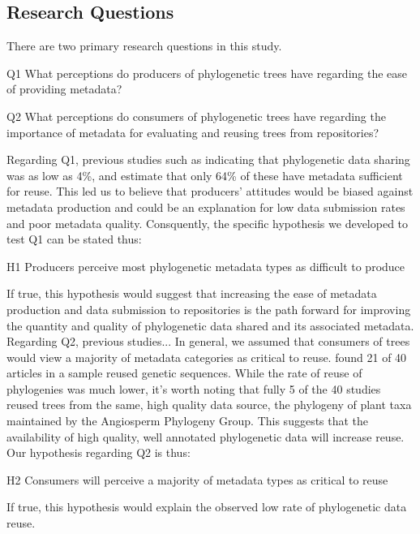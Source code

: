 \documentclass[12pt]{scrartcl}
\begin{document}
\subsection{Research Questions}
There are two primary research questions in this study.  
\begin{compactitem}
	\item[Q1] What perceptions do producers of phylogenetic trees have regarding the ease of providing metadata?
	\item[Q2] What perceptions do consumers of phylogenetic trees have regarding the importance of metadata for evaluating and reusing trees from repositories?
\end{compactitem}
Regarding Q1, previous studies such as \citet{Stoltzfus2012} indicating that phylogenetic data sharing was as low as 4\%, and \citet{Drew2013} estimate that only 64\% of these have metadata sufficient for reuse. This led us to believe that producers' attitudes would be biased against metadata production and could be an explanation for low data submission rates and poor metadata quality.  Consquently, the specific hypothesis we developed to test Q1 can be stated thus:
\begin{compactitem}
	\item[H1] Producers perceive most phylogenetic metadata types as difficult to produce
\end{compactitem}
If true, this hypothesis would suggest that increasing the ease of metadata production and data submission to repositories is the path forward for improving the quantity and quality of phylogenetic data shared and its associated metadata.
Regarding Q2, previous studies...%
In general, we assumed that consumers of trees would view a majority of metadata categories as critical to reuse.  \citet{Stoltzfus2012} found 21 of 40 articles in a sample reused genetic sequences.  While the rate of reuse of phylogenies was much lower, it's worth noting that fully 5 of the 40 studies reused trees from the same, high quality data source, the phylogeny of plant taxa maintained by the Angiosperm Phylogeny Group. %
This suggests that the availability of high quality, well annotated phylogenetic data will increase reuse.  Our hypothesis regarding Q2 is thus:
\begin{compactitem}
	\item[H2] Consumers will perceive a majority of metadata types as critical to reuse
\end{compactitem}
If true, this hypothesis would explain the observed low rate of phylogenetic data reuse.
\end{document}
